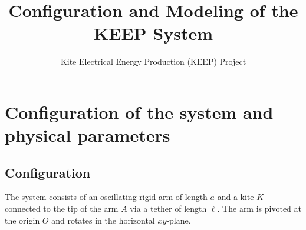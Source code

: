 \documentclass{article}
\title{Configuration and Modeling of the KEEP System}
\author{Kite Electrical Energy Production (KEEP) Project}
\date{}
\begin{document}
\maketitle

\section{Configuration of the system and physical parameters}

\subsection{Configuration}

The system consists of an oscillating rigid arm of length $a$ and a kite $K$ connected to the tip of the arm $A$ via a tether of length $\ell$. The arm is pivoted at the origin $O$ and rotates in the horizontal $xy$-plane. 
\end{document}
